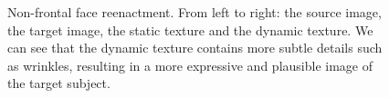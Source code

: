 \documentclass[10pt,twocolumn,letterpaper]{article}
\begin{document}
\begin{figure}[th]
\begin{center}
\end{center}
   \caption{Non-frontal face reenactment. From left to right: the source image, the target image, the static texture and the dynamic texture. We can see that the dynamic texture contains more subtle details such as wrinkles, resulting in a more expressive and plausible image of the target subject.}
   \vspace{-0.05in}
\label{replaceres}
\end{figure}
\end{document}
